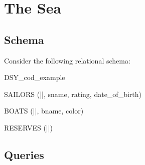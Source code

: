 \section{The Sea}

\subsection{Schema}

Consider the following relational schema:


\begin{sqlSchema}{DSY_cod_example}

    SAILORS (||, sname, rating, date_of_birth)

    BOATS (||, bname, color)

    RESERVES (||)

\end{sqlSchema}


\subsection{Queries}

